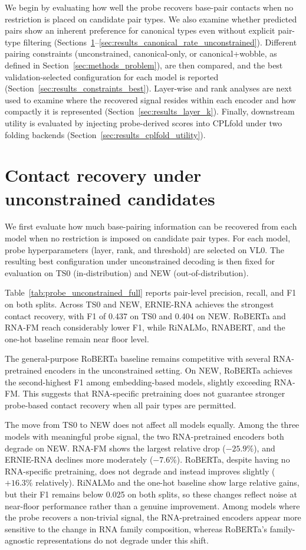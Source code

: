 \documentclass[logo,bsc,singlespacing,parskip]{infthesis}
\begin{document}
We begin by evaluating how well the probe recovers base-pair contacts when no restriction is placed on candidate pair types. We also examine whether predicted pairs show an inherent preference for canonical types even without explicit pair-type filtering
(Sections~\ref{sec:results_probe_unconstrained}--\ref{sec:results_canonical_rate_unconstrained}).
Different pairing constraints (unconstrained, canonical-only, or canonical+wobble, as defined in Section~\ref{sec:methods_problem}), are then compared, and the best validation-selected configuration for each model is reported (Section~\ref{sec:results_constraints_best}). Layer-wise and rank analyses are next used to examine where the recovered signal resides within each encoder and how compactly it is represented (Section~\ref{sec:results_layer_k}). Finally, downstream utility is evaluated by injecting probe-derived scores into CPLfold under two folding backends (Section~\ref{sec:results_cplfold_utility}).
\section{Contact recovery under unconstrained candidates}
\label{sec:results_probe_unconstrained}
We first evaluate how much base-pairing information can be recovered from each model when no restriction is imposed on candidate pair types. For each model, probe hyperparameters (layer, rank, and threshold) are selected on VL0. The resulting best configuration under unconstrained decoding is then fixed for evaluation on TS0 (in-distribution) and NEW (out-of-distribution).

Table~\ref{tab:probe_unconstrained_full} reports pair-level precision, recall, and F1 on both splits. 
Across TS0 and NEW, ERNIE-RNA achieves the strongest contact recovery, with F1 of 0.437 on TS0 and 0.404 on NEW. RoBERTa and RNA-FM reach considerably lower F1, while RiNALMo, RNABERT, and the one-hot baseline remain near floor level.

The general-purpose RoBERTa baseline remains competitive with several RNA-pretrained encoders in the unconstrained setting. On NEW, RoBERTa achieves the second-highest F1 among embedding-based models, slightly exceeding RNA-FM. This suggests that RNA-specific pretraining does not guarantee stronger probe-based contact recovery when all pair types are permitted.

The move from TS0 to NEW does not affect all models equally. Among the three models with meaningful probe signal, the two RNA-pretrained encoders both degrade on NEW. RNA-FM shows the largest relative drop ($-25.9\%$), and ERNIE-RNA declines more moderately ($-7.6\%$). RoBERTa, despite having no RNA-specific pretraining, does not degrade and instead improves slightly ($+16.3\%$ relatively). RiNALMo and the one-hot baseline show large relative gains, but their F1 remains below 0.025 on both splits, so these changes reflect noise at near-floor performance rather than a genuine improvement. Among models where the probe recovers a non-trivial signal, the RNA-pretrained encoders appear more sensitive to the change in RNA family composition, whereas RoBERTa's family-agnostic representations do not degrade under this shift.
\end{document}
